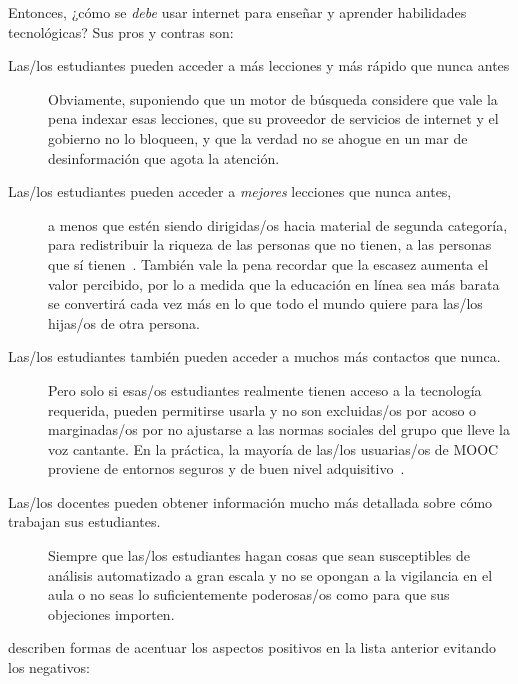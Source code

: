 Entonces, ¿cómo se \emph{debe} usar internet para enseñar y aprender habilidades tecnológicas?
Sus pros y contras son:

\begin{description}

\item[Las/los estudiantes pueden acceder a más lecciones y más rápido que nunca antes]
  Obviamente,
  suponiendo
  que un motor de búsqueda considere que vale la pena indexar esas lecciones,
  que su proveedor de servicios de internet y el gobierno no lo bloqueen,
  y que la verdad no se ahogue en un mar de desinformación que agota la atención.

\item[Las/los estudiantes pueden acceder a \emph{mejores} lecciones que nunca antes,]
  a menos que estén siendo dirigidas/os hacia material de segunda categoría,
  para redistribuir la riqueza de las personas que no tienen, a las personas que sí tienen~\cite{McMi2017}.
  También vale la pena recordar que la escasez aumenta el valor percibido,
  por lo a medida que la educación en línea sea más barata
  se convertirá cada vez más en lo que todo el mundo quiere para las/los hijas/os de otra persona.

\item[Las/los estudiantes también pueden acceder a muchos más contactos que nunca.]
  Pero solo si esas/os estudiantes realmente tienen acceso a la tecnología requerida,
  pueden permitirse usarla
  y no son excluidas/os por acoso o marginadas/os
  por no ajustarse a las normas sociales del grupo que lleve la voz cantante.
  En la práctica,
  la mayoría de las/los usuarias/os de MOOC proviene de entornos seguros y de buen nivel adquisitivo~\cite{Hans2015}.

\item[Las/los docentes pueden obtener información mucho más detallada sobre cómo trabajan sus estudiantes.]
  Siempre que las/los estudiantes hagan cosas que sean susceptibles de análisis automatizado a gran escala
  y no se opongan a la vigilancia en el aula
  o no seas lo suficientemente poderosas/os como para que sus objeciones importen.

\end{description}

\cite{Marg2015,Mill2016a,Nils2017} describen formas de acentuar los aspectos positivos en la lista anterior
evitando los negativos:

